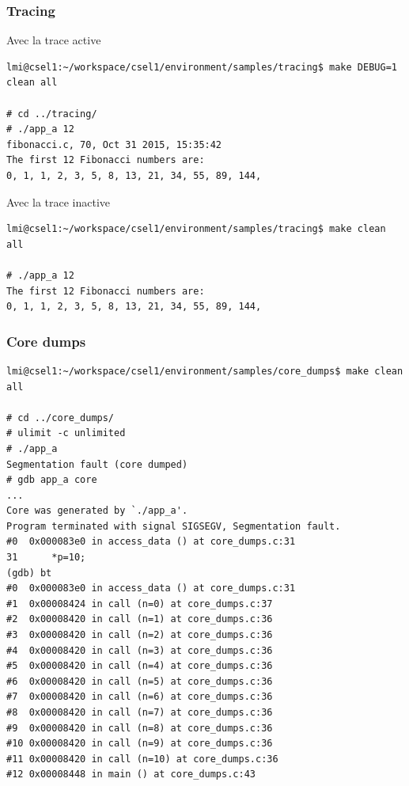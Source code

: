 \subsubsection{Tracing}
Avec la trace active
\begin{lstlisting}
lmi@csel1:~/workspace/csel1/environment/samples/tracing$ make DEBUG=1 clean all

# cd ../tracing/
# ./app_a 12
fibonacci.c, 70, Oct 31 2015, 15:35:42
The first 12 Fibonacci numbers are:
0, 1, 1, 2, 3, 5, 8, 13, 21, 34, 55, 89, 144, 
\end{lstlisting}
Avec la trace inactive
\begin{lstlisting}
lmi@csel1:~/workspace/csel1/environment/samples/tracing$ make clean all

# ./app_a 12
The first 12 Fibonacci numbers are:
0, 1, 1, 2, 3, 5, 8, 13, 21, 34, 55, 89, 144, 
\end{lstlisting}

\subsubsection{Core dumps}
\begin{lstlisting}
lmi@csel1:~/workspace/csel1/environment/samples/core_dumps$ make clean all

# cd ../core_dumps/
# ulimit -c unlimited
# ./app_a 
Segmentation fault (core dumped)
# gdb app_a core
...
Core was generated by `./app_a'.
Program terminated with signal SIGSEGV, Segmentation fault.
#0  0x000083e0 in access_data () at core_dumps.c:31
31		*p=10;
(gdb) bt
#0  0x000083e0 in access_data () at core_dumps.c:31
#1  0x00008424 in call (n=0) at core_dumps.c:37
#2  0x00008420 in call (n=1) at core_dumps.c:36
#3  0x00008420 in call (n=2) at core_dumps.c:36
#4  0x00008420 in call (n=3) at core_dumps.c:36
#5  0x00008420 in call (n=4) at core_dumps.c:36
#6  0x00008420 in call (n=5) at core_dumps.c:36
#7  0x00008420 in call (n=6) at core_dumps.c:36
#8  0x00008420 in call (n=7) at core_dumps.c:36
#9  0x00008420 in call (n=8) at core_dumps.c:36
#10 0x00008420 in call (n=9) at core_dumps.c:36
#11 0x00008420 in call (n=10) at core_dumps.c:36
#12 0x00008448 in main () at core_dumps.c:43
\end{lstlisting}


